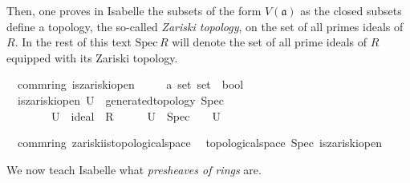 \documentclass[12pt]{scrartcl}
\begin{document}
Then, one proves in Isabelle the subsets of the form $V(\mathfrak{a})$ as the closed subsets define a topology, the so-called \emph{Zariski topology}\label{zariskitop}, on the set of all primes ideals of $R$. In the rest of this text $\text{Spec}\,R$ will denote the set of all prime ideals of $R$ equipped with its Zariski topology.

\begin{isabelle}
\isamarkupfalse%
\ {\isacharparenleft}{\kern0pt}\ comm{\isacharunderscore}{\kern0pt}ring{\isacharparenright}{\kern0pt}\ is{\isacharunderscore}{\kern0pt}zariski{\isacharunderscore}{\kern0pt}open\isanewline
\ \ \ \ {\isacharcolon}{\kern0pt}{\isacharcolon}{\kern0pt}\ {\isachardoublequoteopen}{\isacharprime}{\kern0pt}a\ set\ set\ {\isasymRightarrow}\ bool{\isachardoublequoteclose}\ \isanewline
\ \ {\isachardoublequoteopen}is{\isacharunderscore}{\kern0pt}zariski{\isacharunderscore}{\kern0pt}open\ U\ {\isasymequiv}\ generated{\isacharunderscore}{\kern0pt}topology\ Spec\ \isanewline
\ \ \ \ \ \ \ \ {\isacharbraceleft}{\kern0pt}U{\isachardot}{\kern0pt}\ {\isacharparenleft}{\kern0pt}{\isasymexists}{\isasymaa}{\isachardot}{\kern0pt}\ ideal\ {\isasymaa}\ R\ {\isacharparenleft}{\kern0pt}{\isacharplus}{\kern0pt}{\isacharparenright}{\kern0pt}\ {\isacharparenleft}{\kern0pt}{\isasymcdot}{\isacharparenright}{\kern0pt}\ {\isasymzero}\ {\isasymone}\ {\isasymand}\ U\ {\isacharequal}{\kern0pt}\ Spec\ {\isacharminus}{\kern0pt}\ {\isasymV}\ {\isasymaa}{\isacharparenright}{\kern0pt}{\isacharbraceright}{\kern0pt}\ U{\isachardoublequoteclose}
\end{isabelle}

\begin{isabelle}
\isamarkupfalse%
\ {\isacharparenleft}{\kern0pt}\ comm{\isacharunderscore}{\kern0pt}ring{\isacharparenright}{\kern0pt}\ zariski{\isacharunderscore}{\kern0pt}is{\isacharunderscore}{\kern0pt}topological{\isacharunderscore}{\kern0pt}space{\isacharcolon}{\kern0pt}\isanewline
\ \ {\isachardoublequoteopen}topological{\isacharunderscore}{\kern0pt}space\ Spec\ is{\isacharunderscore}{\kern0pt}zariski{\isacharunderscore}{\kern0pt}open{\isachardoublequoteclose}
\end{isabelle}

We now teach Isabelle what \emph{presheaves of rings} are. 
\end{document}
